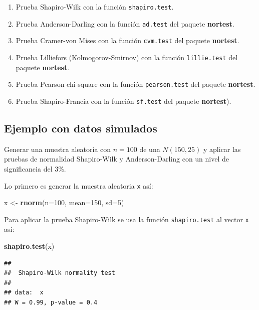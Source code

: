 \documentclass[10pt,]{krantz}
\makeatletter
\newenvironment{Shaded}{\begin{snugshade}}{\end{snugshade}}
\newcommand{\KeywordTok}[1]{\textcolor[rgb]{0.13,0.29,0.53}{\textbf{{#1}}}}
\newcommand{\DataTypeTok}[1]{\textcolor[rgb]{0.13,0.29,0.53}{{#1}}}
\newcommand{\DecValTok}[1]{\textcolor[rgb]{0.00,0.00,0.81}{{#1}}}
\newcommand{\StringTok}[1]{\textcolor[rgb]{0.31,0.60,0.02}{{#1}}}
\newcommand{\NormalTok}[1]{{#1}}
\providecommand{\tightlist}{%
  \setlength{\itemsep}{0pt}\setlength{\parskip}{0pt}}
\newenvironment{kframe}{%
\medskip{}
\setlength{\fboxsep}{.8em}
 \def\at@end@of@kframe{}%
 \ifinner\ifhmode%
  \def\at@end@of@kframe{\end{minipage}}%
  \begin{minipage}{\columnwidth}%
 \fi\fi%
 \def\FrameCommand##1{\hskip\@totalleftmargin \hskip-\fboxsep
 \colorbox{shadecolor}{##1}\hskip-\fboxsep
     \hskip-\linewidth \hskip-\@totalleftmargin \hskip\columnwidth}%
 \MakeFramed {\advance\hsize-\width
   \@totalleftmargin\z@ \linewidth\hsize
   \@setminipage}}%
 {\par\unskip\endMakeFramed%
 \at@end@of@kframe}
\renewenvironment{Shaded}{\begin{kframe}}{\end{kframe}}
\makeatother
\begin{document}
\begin{enumerate}
\def\labelenumi{\arabic{enumi}.}
\tightlist
\item
  Prueba Shapiro-Wilk con la función \texttt{shapiro.test}.
\item
  Prueba Anderson-Darling con la función \texttt{ad.test} del paquete
  \textbf{nortest}.
\item
  Prueba Cramer-von Mises con la función \texttt{cvm.test} del paquete
  \textbf{nortest}.
\item
  Prueba Lilliefors (Kolmogorov-Smirnov) con la función
  \texttt{lillie.test} del paquete \textbf{nortest}.
\item
  Prueba Pearson chi-square con la función \texttt{pearson.test} del
  paquete \textbf{nortest}.
\item
  Prueba Shapiro-Francia con la función \texttt{sf.test} del paquete
  \textbf{nortest}).
\end{enumerate}

\subsection*{Ejemplo con datos
simulados}\label{ejemplo-con-datos-simulados}


Generar una muestra aleatoria con \(n=100\) de una \(N(150, 25)\) y
aplicar las pruebas de normalidad Shapiro-Wilk y Anderson-Darling con un
nivel de significancia del 3\%.

Lo primero es generar la muestra aleatoria \texttt{x} así:

\begin{Shaded}
\begin{Highlighting}[]
\NormalTok{x <-}\StringTok{ }\KeywordTok{rnorm}\NormalTok{(}\DataTypeTok{n=}\DecValTok{100}\NormalTok{, }\DataTypeTok{mean=}\DecValTok{150}\NormalTok{, }\DataTypeTok{sd=}\DecValTok{5}\NormalTok{)}
\end{Highlighting}
\end{Shaded}

Para aplicar la prueba Shapiro-Wilk se usa la función
\texttt{shapiro.test} al vector \texttt{x} así:

\begin{Shaded}
\begin{Highlighting}[]
\KeywordTok{shapiro.test}\NormalTok{(x)}
\end{Highlighting}
\end{Shaded}

\begin{verbatim}
## 
##  Shapiro-Wilk normality test
## 
## data:  x
## W = 0.99, p-value = 0.4
\end{verbatim}
\end{document}
